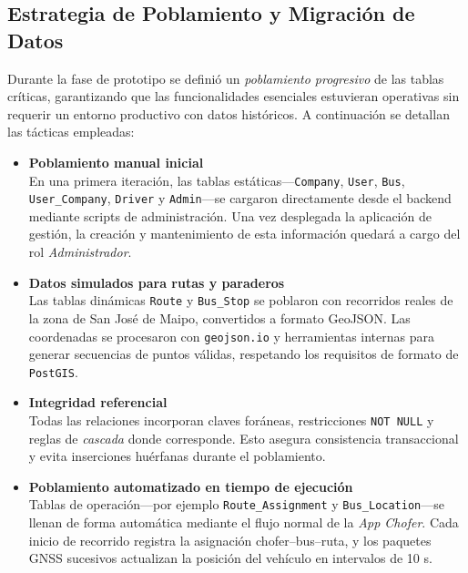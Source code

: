 \documentclass[12pt]{article}
\begin{document}
\clearpage
\subsection{Estrategia de Poblamiento y Migración de Datos}\label{subsec:poblamiento}

Durante la fase de prototipo se definió un \emph{poblamiento progresivo} de las tablas críticas, garantizando que las funcionalidades esenciales estuvieran operativas sin requerir un entorno productivo con datos históricos. A continuación se detallan las tácticas empleadas:

\begin{itemize}
    \item \textbf{Poblamiento manual inicial}\\
    En una primera iteración, las tablas estáticas—\texttt{Company}, \texttt{User}, \texttt{Bus}, \texttt{User\_Company}, \texttt{Driver} y \texttt{Admin}—se cargaron directamente desde el backend mediante scripts de administración. Una vez desplegada la aplicación de gestión, la creación y mantenimiento de esta información quedará a cargo del rol \textit{Administrador}.
    
    \item \textbf{Datos simulados para rutas y paraderos}\\
    Las tablas dinámicas \texttt{Route} y \texttt{Bus\_Stop} se poblaron con recorridos reales de la zona de San José de Maipo, convertidos a formato GeoJSON. Las coordenadas se procesaron con \texttt{geojson.io} y herramientas internas para generar secuencias de puntos válidas, respetando los requisitos de formato de \texttt{PostGIS}.  
    
    \item \textbf{Integridad referencial}\\
    Todas las relaciones incorporan claves foráneas, restricciones \texttt{NOT NULL} y reglas de \textit{cascada} donde corresponde. Esto asegura consistencia transaccional y evita inserciones huérfanas durante el poblamiento.
    
    \item \textbf{Poblamiento automatizado en tiempo de ejecución}\\
    Tablas de operación—por ejemplo \texttt{Route\_Assignment} y \texttt{Bus\_Location}—se llenan de forma automática mediante el flujo normal de la \emph{App Chofer}. Cada inicio de recorrido registra la asignación chofer–bus–ruta, y los paquetes GNSS sucesivos actualizan la posición del vehículo en intervalos de 10 s.
\end{itemize}
\end{document}
